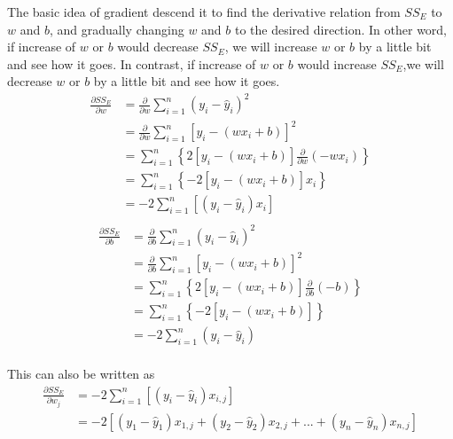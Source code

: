 \documentclass[
	letterpaper
]{article}
\begin{document}
The basic idea of gradient descend it to find the derivative relation from $SS_E$ to $w$ and $b$, and gradually changing $w$ and $b$ to the desired direction.
In other word, if increase of $w$ or $b$ would decrease $SS_E$, we will increase $w$ or $b$ by a little bit and see how it goes. 
In contrast, if increase of $w$ or $b$ would increase $SS_E$,we will decrease $w$ or $b$ by a little bit and see how it goes. 
\begin{equation}
\begin{split}
\frac{\partial SS_E}{\partial w} & = \frac{\partial}{\partial w} \sum_{i = 1}^n (y_i - \hat y_i) ^2 \\
&= \frac{\partial}{\partial w}\sum_{i = 1}^n [y_i - (w x_i + b)] ^2\\
& = \sum_{i = 1}^n \left\{2[y_i - (w x_i + b)] \frac{\partial}{\partial w}(-wx_i)\right\}\\
& = \sum_{i = 1}^n \left\{-2[y_i - (w x_i + b)] x_i\right\}\\
& = -2\sum_{i = 1}^n\left[(y_i - \hat y_i)  x_i\right]\\
\end{split}
\end{equation}
\begin{equation}
\begin{split}
\frac{\partial SS_E}{\partial b} & = \frac{\partial}{\partial b} \sum_{i = 1}^n (y_i - \hat y_i) ^2 \\
&= \frac{\partial}{\partial b}\sum_{i = 1}^n [y_i - (w x_i + b)] ^2\\
& = \sum_{i = 1}^n \left\{2[y_i - (w x_i + b)] \frac{\partial}{\partial b}(-b)\right\}\\
& = \sum_{i = 1}^n \left\{-2[y_i - (w x_i + b)]\right\}\\
& = -2\sum_{i = 1}^n(y_i - \hat y_i)\\
\end{split}
\end{equation}

This can also be written as 
\begin{equation}
\begin{split}
\frac{\partial SS_E}{\partial w_j} & =-2\sum_{i = 1}^n\left[(y_i - \hat y_i)  x_{i,j}\right]\\
&=-2\left[(y_1 - \hat y_1)  x_{1,j} + (y_2 - \hat y_2)  x_{2,j} + ... + (y_n - \hat y_n)  x_{n,j}\right]\\
\end{split}
\end{equation}
\end{document}
